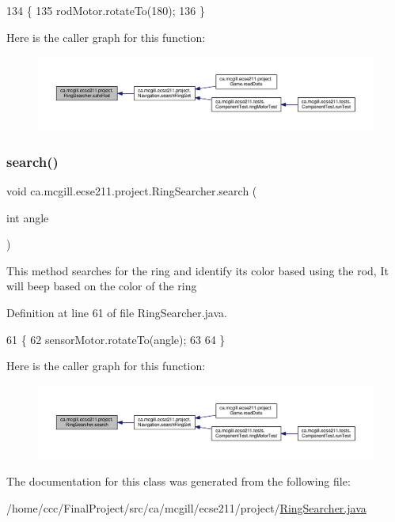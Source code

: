 \begin{DoxyCode}
134                         \{
135     rodMotor.rotateTo(180);
136   \}
\end{DoxyCode}
Here is the caller graph for this function\+:
\nopagebreak
\begin{figure}[H]
\begin{center}
\leavevmode
\includegraphics[width=350pt]{classca_1_1mcgill_1_1ecse211_1_1project_1_1_ring_searcher_a0b96c45f7df3eb557496acab33930cd5_icgraph}
\end{center}
\end{figure}
\mbox{\label{classca_1_1mcgill_1_1ecse211_1_1project_1_1_ring_searcher_a6f66df0810034dfb407d792ded013a8e}} 
\subsubsection{\texorpdfstring{search()}{search()}}
{\footnotesize\ttfamily void ca.\+mcgill.\+ecse211.\+project.\+Ring\+Searcher.\+search (\begin{DoxyParamCaption}\item[{int}]{angle }\end{DoxyParamCaption})}

This method searches for the ring and identify its color based using the rod, It will beep based on the color of the ring 

Definition at line 61 of file Ring\+Searcher.\+java.


\begin{DoxyCode}
61                                 \{
62     sensorMotor.rotateTo(angle);
63     
64   \}
\end{DoxyCode}
Here is the caller graph for this function\+:
\nopagebreak
\begin{figure}[H]
\begin{center}
\leavevmode
\includegraphics[width=350pt]{classca_1_1mcgill_1_1ecse211_1_1project_1_1_ring_searcher_a6f66df0810034dfb407d792ded013a8e_icgraph}
\end{center}
\end{figure}


The documentation for this class was generated from the following file\+:\begin{DoxyCompactItemize}
\item 
/home/ccc/\+Final\+Project/src/ca/mcgill/ecse211/project/\hyperlink{_ring_searcher_8java}{Ring\+Searcher.\+java}\end{DoxyCompactItemize}
